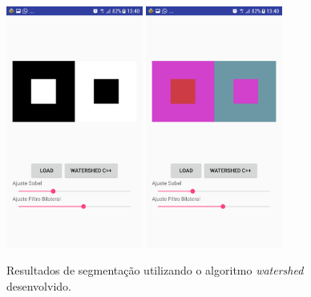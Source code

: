 \begin{figure}[!htb]
 \centering
 \def\baselinestretch{1}\small\normalsize
 \includegraphics[width=0.4\textwidth]{img/imagem_watershed_desenvolvido_app_n7.png}\qquad
 \includegraphics[width=0.4\textwidth]{img/resultado_watershed_desenvolvido_app_n7.png} 
 \caption{\label{fig:resultado_watershed_desenvolvido_app_p7}Resultados de segmentação utilizando o algoritmo \textit{watershed} desenvolvido.}
\end{figure}	

 




